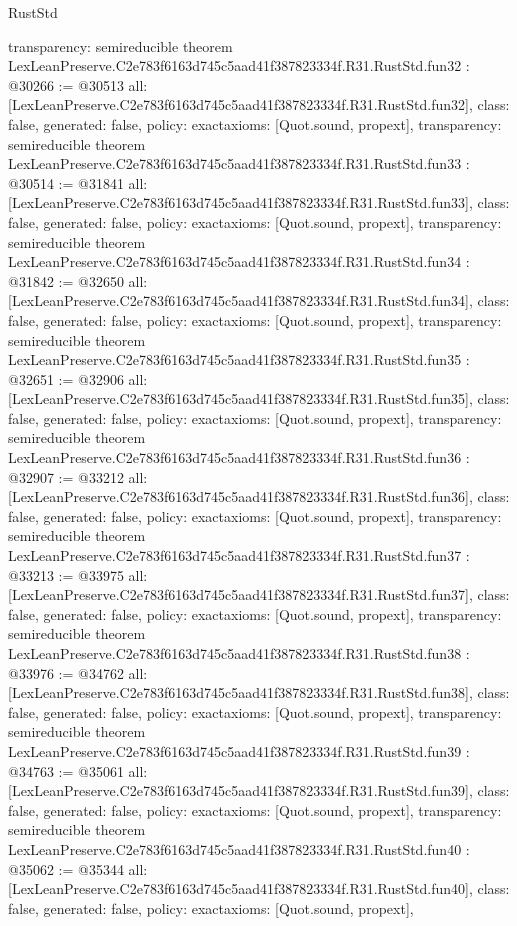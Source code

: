 \begin{lexlean}{RustStd}
\begin{coremodule}
{  transparency: semireducible
}
theorem LexLeanPreserve.C2e783f6163d745c5aad41f387823334f.R31.RustStd.fun32 : @30266 := @30513 {
  all: [LexLeanPreserve.C2e783f6163d745c5aad41f387823334f.R31.RustStd.fun32],
  class: false,
  generated: false,
  policy: exact{axioms: [Quot.sound, propext]},
  transparency: semireducible
}
theorem LexLeanPreserve.C2e783f6163d745c5aad41f387823334f.R31.RustStd.fun33 : @30514 := @31841 {
  all: [LexLeanPreserve.C2e783f6163d745c5aad41f387823334f.R31.RustStd.fun33],
  class: false,
  generated: false,
  policy: exact{axioms: [Quot.sound, propext]},
  transparency: semireducible
}
theorem LexLeanPreserve.C2e783f6163d745c5aad41f387823334f.R31.RustStd.fun34 : @31842 := @32650 {
  all: [LexLeanPreserve.C2e783f6163d745c5aad41f387823334f.R31.RustStd.fun34],
  class: false,
  generated: false,
  policy: exact{axioms: [Quot.sound, propext]},
  transparency: semireducible
}
theorem LexLeanPreserve.C2e783f6163d745c5aad41f387823334f.R31.RustStd.fun35 : @32651 := @32906 {
  all: [LexLeanPreserve.C2e783f6163d745c5aad41f387823334f.R31.RustStd.fun35],
  class: false,
  generated: false,
  policy: exact{axioms: [Quot.sound, propext]},
  transparency: semireducible
}
theorem LexLeanPreserve.C2e783f6163d745c5aad41f387823334f.R31.RustStd.fun36 : @32907 := @33212 {
  all: [LexLeanPreserve.C2e783f6163d745c5aad41f387823334f.R31.RustStd.fun36],
  class: false,
  generated: false,
  policy: exact{axioms: [Quot.sound, propext]},
  transparency: semireducible
}
theorem LexLeanPreserve.C2e783f6163d745c5aad41f387823334f.R31.RustStd.fun37 : @33213 := @33975 {
  all: [LexLeanPreserve.C2e783f6163d745c5aad41f387823334f.R31.RustStd.fun37],
  class: false,
  generated: false,
  policy: exact{axioms: [Quot.sound, propext]},
  transparency: semireducible
}
theorem LexLeanPreserve.C2e783f6163d745c5aad41f387823334f.R31.RustStd.fun38 : @33976 := @34762 {
  all: [LexLeanPreserve.C2e783f6163d745c5aad41f387823334f.R31.RustStd.fun38],
  class: false,
  generated: false,
  policy: exact{axioms: [Quot.sound, propext]},
  transparency: semireducible
}
theorem LexLeanPreserve.C2e783f6163d745c5aad41f387823334f.R31.RustStd.fun39 : @34763 := @35061 {
  all: [LexLeanPreserve.C2e783f6163d745c5aad41f387823334f.R31.RustStd.fun39],
  class: false,
  generated: false,
  policy: exact{axioms: [Quot.sound, propext]},
  transparency: semireducible
}
theorem LexLeanPreserve.C2e783f6163d745c5aad41f387823334f.R31.RustStd.fun40 : @35062 := @35344 {
  all: [LexLeanPreserve.C2e783f6163d745c5aad41f387823334f.R31.RustStd.fun40],
  class: false,
  generated: false,
  policy: exact{axioms: [Quot.sound, propext]},
}
\end{coremodule}
\end{lexlean}

